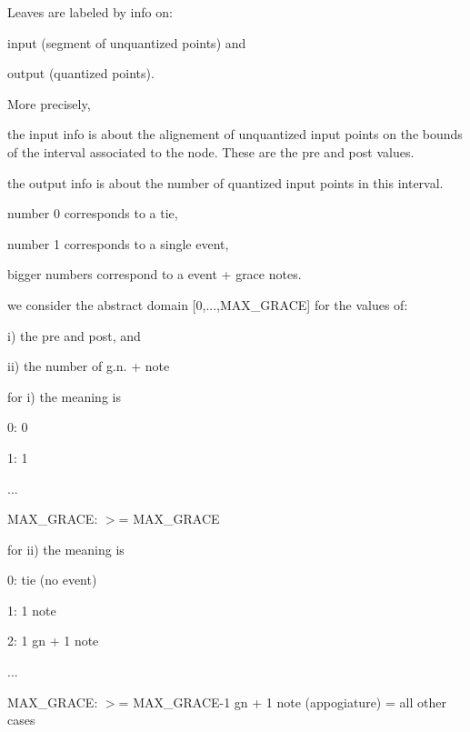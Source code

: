 Leaves are labeled by info on\+:
\begin{DoxyItemize}
\item input (segment of unquantized points) and
\item output (quantized points).
\end{DoxyItemize}

More precisely,
\begin{DoxyItemize}
\item the input info is about the alignement of unquantized input points on the bounds of the interval associated to the node. These are the pre and post values.
\item the output info is about the number of quantized input points in this interval.
\begin{DoxyItemize}
\item number 0 corresponds to a tie,
\item number 1 corresponds to a single event,
\item bigger numbers correspond to a event + grace notes.
\end{DoxyItemize}
\end{DoxyItemize}

we consider the abstract domain \mbox{[}0,...,M\+A\+X\+\_\+\+G\+R\+A\+CE\mbox{]} for the values of\+:
\begin{DoxyItemize}
\item i) the pre and post, and
\item ii) the number of g.\+n. + note
\end{DoxyItemize}

for i) the meaning is
\begin{DoxyItemize}
\item 0\+: 0
\item 1\+: 1
\item ...
\item M\+A\+X\+\_\+\+G\+R\+A\+CE\+: $>$= M\+A\+X\+\_\+\+G\+R\+A\+CE
\end{DoxyItemize}

for ii) the meaning is
\begin{DoxyItemize}
\item 0\+: tie (no event)
\item 1\+: 1 note
\item 2\+: 1 gn + 1 note
\item ...
\item M\+A\+X\+\_\+\+G\+R\+A\+CE\+: $>$= M\+A\+X\+\_\+\+G\+R\+A\+C\+E-\/1 gn + 1 note (appogiature) = all other cases
\end{DoxyItemize}

